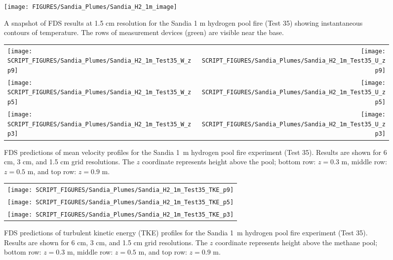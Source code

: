 \begin{figure}[h]
\begin{center}
\texttt{[image: FIGURES/Sandia\_Plumes/Sandia\_H2\_1m\_image]}
\caption[Sandia 1~m hydrogen pool fire instantaneous temperature contours]{A snapshot of FDS results at 1.5 cm resolution for the Sandia 1 m hydrogen pool fire (Test 35) showing instantaneous contours of temperature.  The rows of measurement devices (green) are visible near the base.}
\label{Sandia_H2_1m_image}
\end{center}
\end{figure}

\newpage

\begin{figure}[p]
\begin{tabular*}{\textwidth}{l@{\extracolsep{\fill}}r}
\texttt{[image: SCRIPT\_FIGURES/Sandia\_Plumes/Sandia\_H2\_1m\_Test35\_W\_zp9]} &
\texttt{[image: SCRIPT\_FIGURES/Sandia\_Plumes/Sandia\_H2\_1m\_Test35\_U\_zp9]} \\
\texttt{[image: SCRIPT\_FIGURES/Sandia\_Plumes/Sandia\_H2\_1m\_Test35\_W\_zp5]} &
\texttt{[image: SCRIPT\_FIGURES/Sandia\_Plumes/Sandia\_H2\_1m\_Test35\_U\_zp5]} \\
\texttt{[image: SCRIPT\_FIGURES/Sandia\_Plumes/Sandia\_H2\_1m\_Test35\_W\_zp3]} &
\texttt{[image: SCRIPT\_FIGURES/Sandia\_Plumes/Sandia\_H2\_1m\_Test35\_U\_zp3]}
\end{tabular*}
\caption[Sandia 1~m hydrogen pool fire (Test 35) mean velocity profiles]
{FDS predictions of mean velocity profiles for the Sandia 1~m hydrogen pool fire experiment (Test 35). Results are shown for 6 cm, 3 cm, and 1.5 cm grid resolutions. The $z$ coordinate represents height above the pool; bottom row: $z=0.3$ m, middle row: $z=0.5$ m, and top row: $z=0.9$ m.}
\label{Sandia_H2_1m_Test35_velocity}
\end{figure}

\begin{figure}[p]
\begin{center}
\begin{tabular}{c}
\texttt{[image: SCRIPT\_FIGURES/Sandia\_Plumes/Sandia\_H2\_1m\_Test35\_TKE\_p9]} \\
\texttt{[image: SCRIPT\_FIGURES/Sandia\_Plumes/Sandia\_H2\_1m\_Test35\_TKE\_p5]} \\
\texttt{[image: SCRIPT\_FIGURES/Sandia\_Plumes/Sandia\_H2\_1m\_Test35\_TKE\_p3]}
\end{tabular}
\caption[Sandia 1~m hydrogen pool fire (Test 25) turbulent kinetic energy]
{FDS predictions of turbulent kinetic energy (TKE) profiles for the Sandia 1~m hydrogen pool fire experiment (Test 35). Results are shown for 6 cm, 3 cm, and 1.5 cm grid resolutions. The $z$ coordinate represents height above the methane pool; bottom row: $z=0.3$ m, middle row: $z=0.5$ m, and top row: $z=0.9$ m.}
\label{Sandia_H2_1m_Test35_tke}
\end{center}
\end{figure}


